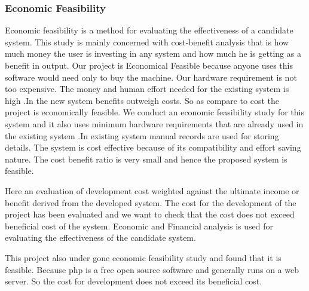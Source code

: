 \documentclass[a4paper,12pt]{article}
\begin{document}
\subsubsection{Economic Feasibility}\vspace{2mm}
Economic feasibility is a method for evaluating the effectiveness of a candidate system. This study is mainly concerned with cost-benefit analysis that is how much money the user is investing in any system and how much he is getting as a benefit in output. Our project is Economical Feasible because anyone uses this software would need only to buy the machine. Our hardware requirement is not too expensive. The money and human effort needed for the existing system is high .In the new system benefits outweigh costs. So as compare to cost the project is economically feasible.
We conduct an economic feasibility study for this system and it also uses minimum hardware requirements that are already used in the existing system .In existing system manual records are used for storing details. The system is cost effective because of its compatibility and effort saving nature. The cost benefit ratio is very small and hence the proposed system is feasible.
\par\vspace{2mm}
Here an evaluation of development cost weighted against the ultimate income or benefit derived from the developed system. The cost for the development of the project has been evaluated and we want to check that the cost does not exceed beneficial cost of the system. Economic and Financial analysis is used for evaluating the effectiveness of the candidate system.\par
This project also under gone economic feasibility study and found that it is feasible. Because php is a free open source software and generally runs on a web server. So the cost for development does not exceed its beneficial cost.
\end{document}
